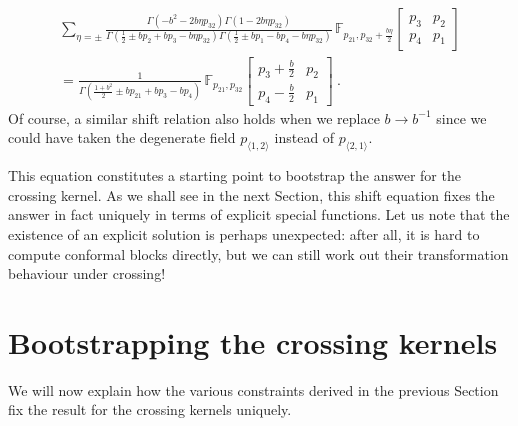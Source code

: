 \documentclass[12pt,a4paper]{article}
\begin{document}
\begin{multline} 
\sum_{\eta=\pm} \frac{ \Gamma(-b^2-2b \eta p_{32})\Gamma(1-2b \eta p_{32})}{\Gamma(\frac{1}{2}\pm b p_2+b p_3-b \eta p_{32})\Gamma(\frac{1}{2} \pm b p_1-b p_4- b \eta p_{32})} \, \mathbb{F}_{p_{21},p_{32}+\frac{b \eta}{2}}\!\begin{bmatrix}
    p_3 & p_2 \\
    p_4 & p_1
\end{bmatrix}  \\
=\frac{1}{\Gamma(\frac{1+b^2}{2} \pm b p_{21}+b p_3-b p_4)} \, \mathbb{F}_{p_{21},p_{32}} \!\begin{bmatrix}
    p_3+\frac{b}{2} & p_2 \\
    p_4-\frac{b}{2} & p_1
\end{bmatrix} \ .\label{eq:shift relation}
\end{multline}
Of course, a similar shift relation also holds when we replace $b \to b^{-1}$ since we could have taken the degenerate field $p_{\langle 1,2 \rangle}$ instead of $p_{\langle 2,1 \rangle}$.

This equation constitutes a starting point to bootstrap the answer for the crossing kernel. As we shall see in the next Section, this shift equation fixes the answer in fact uniquely in terms of explicit special functions. Let us note that the existence of an explicit solution is perhaps unexpected: after all, it is hard to compute conformal blocks directly, but we can still work out their transformation behaviour under crossing!


\section{Bootstrapping the crossing kernels} \label{sec:bootstrapping the crossing kernels}
We will now explain how the various constraints derived in the previous Section fix the result for the crossing kernels uniquely.
\end{document}
